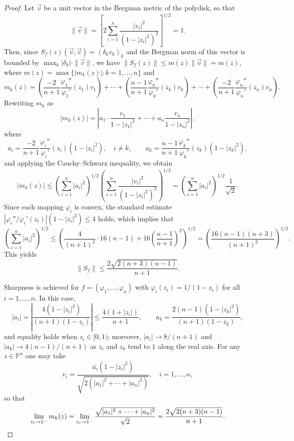 \documentclass[10pt,a4paper]{amsart}
\begin{document}
\begin{proof}
Let $\vec{v}$ be a unit vector in the Bergman metric of the polydisk, so that
\[
\|\vec{v}\|=\left[2\sum_{i=1}^n\frac{|v_i|^2}{(1-|z_i|^2)^2}\right]^{1/2}=1.
\]
Then, since $S_f(z)(\vec{v},\vec{v})=(\delta_k v_k)_k$ and the Bergman norm
of this vector is bounded by $\max_k|\delta_k|\cdot\|\vec{v}\|$, we have
$\|S_f(z)\|\leq m(z)\|\vec{v}\|=m(z)$, where
$m(z)=\max\{|m_k(z)|:k=1,\ldots,n\}$ and
\[
m_k(z) =\left(\frac{-2}{n+1}\frac{\varphi_1''}{\varphi_1'}(z_1)v_1
\right)
+\cdots+\left(\frac{n-1}{n+1}\frac{\varphi_k''}{\varphi_k'}(z_k)v_k
\right)
+\cdots+\left(\frac{-2}{n+1}\frac{\varphi_n''}{\varphi_n'}(z_n)v_n
\right).
\]
Rewriting $m_k$ as
\[
|m_k(z)|=
\left|a_1\cdot\frac{v_1}{1-|z_1|^2}+\cdots+a_n\frac{v_n}{1-|z_n|^2}\right|,
\]
where
\[
a_i=\frac{-2}{n+1}\frac{\varphi_i''}{\varphi_i'}(z_i)(1-|z_i|^2),
\quad i\neq k,
\qquad
a_k=\frac{n-1}{n+1}\frac{\varphi_k''}{\varphi_k'}(z_k)(1-|z_k|^2),
\]
and applying the Cauchy--Schwarz inequality, we obtain
\[
|m_k(z)| \leq
\left(\sum_{i=1}^{n}|a_i|^2\right)^{1/2}
\left(\sum_{i=1}^{n}\frac{|v_i|^2}{(1-|z_i|^2)^2}\right)^{1/2}
=\left(\sum_{i=1}^{n}|a_i|^2\right)^{1/2}\frac{1}{\sqrt{2}}.
\]
Since each mapping $\varphi_i$ is convex, the standard estimate
$|\varphi_i''/\varphi_i'(z_i)|(1-|z_i|^2)\leq 4$ holds, which implies that
\[
\left(\sum_{i=1}^{n}|a_i|^2\right)^{1/2}
\leq
\left(\frac{4}{(n+1)^2}\cdot16(n-1)+16\left(\frac{n-1}{n+1}\right)^2\right)^{1/2}
=\left(\frac{16(n-1)(n+3)}{(n+1)^2}\right)^{1/2}.
\]
This yields
\[
\|S_f\|\leq \frac{2\sqrt{2(n+3)(n-1)}}{n+1}.
\]

Sharpness is achieved for $f=(\varphi_1,\ldots,\varphi_n)$ with
$\varphi_i(z_i)=1/(1-z_i)$ for all $i=1,\ldots,n$. In this case,
\[
|a_i|=\left|\frac{4(1-|z_i|^2)}{(n+1)(1-z_i)}\right|\leq \frac{4(1+|z_i|)}{n+1},
\qquad
a_k=\frac{2(n-1)(1-|z_k|^2)}{(n+1)(1-z_k)},
\]
and equality holds when $z_i\in[0,1)$; moreover, $|a_i|\to 8/(n+1)$ and
$|a_k|\to 4(n-1)/(n+1)$ as $z_i$ and $z_k$ tend to $1$ along the real axis.
For any $z\in\mathbb{P}^n$ one may take
\[
v_i=\frac{\overline{a_i}(1-|z_i|^2)}{\sqrt{2(|a_1|^2+\cdots+|a_n|^2)}},
\quad i=1,\ldots,n,
\]
so that
\[
\lim_{z_i\to 1^-}m_k(z)
=\lim_{z_i\to 1^-}\frac{\sqrt{|a_1|^2+\cdots+|a_n|^2}}{\sqrt{2}}
= \frac{2\sqrt{2(n+3)(n-1)}}{n+1}. \qedhere
\]
\end{proof}
\end{document}
